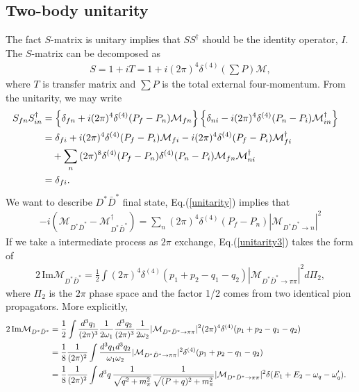 \documentclass[aps,prd,preprintnumbers,showpacs,showkeys,nofootinbib,
superscriptaddress,fleqn,floatfix,tightenlines, 10pt]{revtex4-1}
\begin{document}
\subsection{Two-body unitarity}
The fact $S$-matrix is unitary implies that $SS^\dagger$ should be
the identity operator, $I$. The $S$-matrix can be decomposed as
\begin{align}
	S = 1 + iT = 1 + i (2\pi)^4 \delta^{(4)} (\sum{P}) \mathcal{M},
\end{align}
where $T$ is transfer matrix and $\sum{P}$ is the total external
four-momentum. From the unitarity, we may write
\begin{align} \label{unitarity}
	S_{fn}S_{in}^\dagger &= \left\{\delta_{fn} + i(2\pi)^4 \delta^{(4)}(P_f - P_n) \mathcal{M}_{fn} \right\}
	\left\{\delta_{ni} - i(2\pi)^4 \delta^{(4)}(P_n - P_i) \mathcal{M}_{in}^\dagger \right\} \cr
	&= \delta_{fi} + i(2\pi)^4 \delta^{(4)} (P_f - P_i) \mathcal{M}_{fi} - i(2\pi)^4 \delta^{(4)} (P_f - P_i) \mathcal{M}_{fi}^\dagger \cr
	&\ \ \ +\sum_n {(2\pi)^8 \delta^{(4)}(P_f - P_n) \delta^{(4)}(P_n - P_i) \mathcal{M}_{fn} \mathcal{M}_{ni}^\dagger} \cr
	&= \delta_{fi}.
\end{align}
We want to describe $D^* \bar{D}^*$ final state, Eq.(\ref{unitarity}) implies that
\begin{align} \label{unitarity3}
	-i\left(\mathcal{M}_{D^* \bar{D}^*} - \mathcal{M}_{D^* \bar{D}^*}^\dagger \right) =
	\sum_n {(2\pi)^4 \delta^{(4)}(P_f - P_n) |\mathcal{M}_{{D^* \bar{D}^*} \rightarrow n}|^2}
\end{align}
If we take a intermediate process as $2\pi$ exchange, Eq.(\ref{unitarity3}) takes the form of
\begin{align}
	2\, \mathrm{Im} \mathcal{M}_{D^* \bar{D}^*} = \frac{1}{2}
	\int{(2\pi)^4 \delta^{(4)}(p_1 + p_2 - q_1 - q_2) |\mathcal{M}_{{D^* \bar{D}^*} \rightarrow \pi\pi}|^2} d \Pi_2,
\end{align}
where $\Pi_2$ is the $2\pi$ phase space and the factor 1/2 comes
from two identical pion propagators. More explicitly,
\begin{align}
	2\, \mathrm{Im} \mathcal{M}_{D^* \bar{D}^*} & = \frac{1}{2}
	\int { \frac{d^3 q_1}{(2\pi)^3}\frac{1}{2\omega_1} \frac{d^3 q_2}{(2\pi)^3} \frac{1}{2\omega_2}
	|\mathcal{M}_{{D^* \bar{D}^*} \rightarrow \pi\pi}|^2} (2\pi)^4 \delta^{(4)}(p_1 + p_2 - q_1 - q_2) \cr
	& = \frac{1}{8} \frac{1}{(2\pi)^2} \int { \frac{d^3 q_1 d^3 q_2}{\omega_1 \omega_2}
	|\mathcal{M}_{{D^* \bar{D}^*} \rightarrow \pi\pi}|^2 \delta^{(4)}(p_1 + p_2 - q_1 - q_2)} \cr
	& = \frac{1}{8} \frac{1}{(2\pi)^2} \int {d^3 q \, \frac{1}{\sqrt{q^2 + m_\pi^2}} \frac{1}{\sqrt{(P+q)^2 + m_\pi^2}}
	|\mathcal{M}_{{D^* \bar{D}^*} \rightarrow \pi\pi}|^2 \delta(E_1 + E_2 - \omega_q - \omega_q')}.
\end{align}
\end{document}
